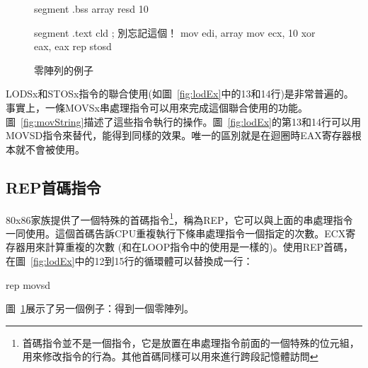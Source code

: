 \begin{figure}[t]
\begin{AsmCodeListing}[frame=single]
segment .bss
array  resd 10

segment .text
      cld                   ; 別忘記這個！
      mov    edi, array
      mov    ecx, 10
      xor    eax, eax
      rep stosd
\end{AsmCodeListing}
\caption{零陣列的例子\label{fig:zeroArrayEx}}
\end{figure}

{\code LODSx}和{\code STOSx}指令的聯合使用(如圖~\ref{fig:lodEx}中的13和14行)是非常普遍的。事實上，一條{\code MOVSx}串處理指令可以用來完成這個聯合使用的功能。圖~\ref{fig:movString}描述了這些指令執行的操作。圖~\ref{fig:lodEx}的第13和14行可以用{\code MOVSD}指令來替代，能得到同樣的效果。唯一的區別就是在迴圈時EAX寄存器根本就不會被使用。

\subsection{{\code REP}首碼指令}

80x86家族提供了一個特殊的首碼指令\footnote{首碼指令並不是一個指令，它是放置在串處理指令前面的一個特殊的位元組，用來修改指令的行為。其他首碼同樣可以用來進行跨段記憶體訪問}，稱為{\code REP}，它可以與上面的串處理指令一同使用。這個首碼告訴CPU重複執行下條串處理指令一個指定的次數。ECX寄存器用來計算重複的次數
(和在{\code LOOP}指令中的使用是一樣的)。使用{\code REP}首碼，在圖~\ref{fig:lodEx}中的12到15行的循環體可以替換成一行：
\begin{AsmCodeListing}[frame=none, numbers=none]
      rep movsd
\end{AsmCodeListing}
圖~\ref{fig:zeroArrayEx}展示了另一個例子：得到一個零陣列。


